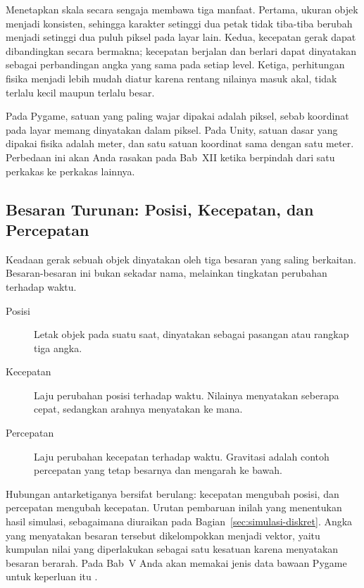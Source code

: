 Menetapkan skala secara sengaja membawa tiga manfaat. Pertama, ukuran objek
menjadi konsisten, sehingga karakter setinggi dua petak tidak tiba-tiba
berubah menjadi setinggi dua puluh piksel pada layar lain. Kedua, kecepatan
gerak dapat dibandingkan secara bermakna; kecepatan berjalan dan berlari dapat
dinyatakan sebagai perbandingan angka yang sama pada setiap level. Ketiga,
perhitungan fisika menjadi lebih mudah diatur karena rentang nilainya masuk
akal, tidak terlalu kecil maupun terlalu besar.

\begin{catatabox}
Pada Pygame, satuan yang paling wajar dipakai adalah piksel, sebab koordinat
pada layar memang dinyatakan dalam piksel. Pada Unity, satuan dasar yang
dipakai fisika adalah meter, dan satu satuan koordinat sama dengan satu meter.
Perbedaan ini akan Anda rasakan pada Bab~XII ketika berpindah dari satu
perkakas ke perkakas lainnya.
\end{catatabox}

\subsection{Besaran Turunan: Posisi, Kecepatan, dan Percepatan}

Keadaan gerak sebuah objek dinyatakan oleh tiga besaran yang saling
berkaitan. Besaran-besaran ini bukan sekadar nama, melainkan tingkatan
perubahan terhadap waktu.

\begin{description}
  \item[Posisi] Letak objek pada suatu saat, dinyatakan sebagai pasangan atau
        rangkap tiga angka.
  \item[Kecepatan] Laju perubahan posisi terhadap waktu. Nilainya menyatakan
        seberapa cepat, sedangkan arahnya menyatakan ke mana.
  \item[Percepatan] Laju perubahan kecepatan terhadap waktu. Gravitasi adalah
        contoh percepatan yang tetap besarnya dan mengarah ke bawah.
\end{description}

Hubungan antarketiganya bersifat berulang: kecepatan mengubah posisi, dan
percepatan mengubah kecepatan. Urutan pembaruan inilah yang menentukan hasil
simulasi, sebagaimana diuraikan pada Bagian~\ref{sec:simulasi-diskret}. Angka
yang menyatakan besaran tersebut dikelompokkan menjadi vektor, yaitu kumpulan
nilai yang diperlakukan sebagai satu kesatuan karena menyatakan besaran
berarah. Pada Bab~V Anda akan memakai jenis data bawaan Pygame untuk keperluan
itu \cite{pygame-docs}.

